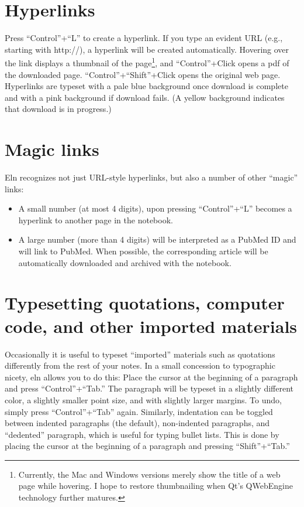 \documentclass[11pt]{report}
\begin{document}
\section{Hyperlinks}

Press ``Control''+``L'' to create a hyperlink. If you type an evident
URL (e.g., starting with http://), a hyperlink will be created
automatically. Hovering over the link displays a thumbnail of the
page\footnote{Currently, the Mac and Windows versions merely show the
  title of a web page while hovering. I hope to restore thumbnailing
  when Qt's QWebEngine technology further matures.}, and
``Control''+Click opens a pdf of the downloaded
page. ``Control''+``Shift''+Click opens the original web
page. Hyperlinks are typeset with a pale blue background once download
is complete and with a pink background if download fails. (A yellow
background indicates that download is in progress.)

\section{Magic links}

Eln recognizes not just URL-style hyperlinks, but also a number of
other ``magic'' links:
\begin{itemize}
\item A small number (at most 4 digits), upon pressing ``Control''+``L''
becomes a hyperlink to another page in the notebook.
\item A large number (more than 4 digits)
will be interpreted as a PubMed ID and will link to PubMed. When
possible, the corresponding article will be automatically downloaded
and archived with the notebook. 
\end{itemize}

\section{Typesetting quotations, computer code, and other imported materials}

Occasionally it is useful to typeset ``imported'' materials such as
quotations differently from the rest of your notes. In a small
concession to typographic nicety, eln allows you to do this: Place the
cursor at the beginning of a paragraph and press ``Control''+``Tab.''
The paragraph will be typeset in a slightly different color, a
slightly smaller point size, and with slightly larger margins. To
undo, simply press ``Control''+``Tab'' again. Similarly, indentation
can be toggled between indented paragraphs (the default), non-indented
paragraphs, and ``dedented'' paragraph, which is useful for typing
bullet lists. This is done by placing the cursor at the beginning of a
paragraph and pressing ``Shift''+``Tab.''
\end{document}
